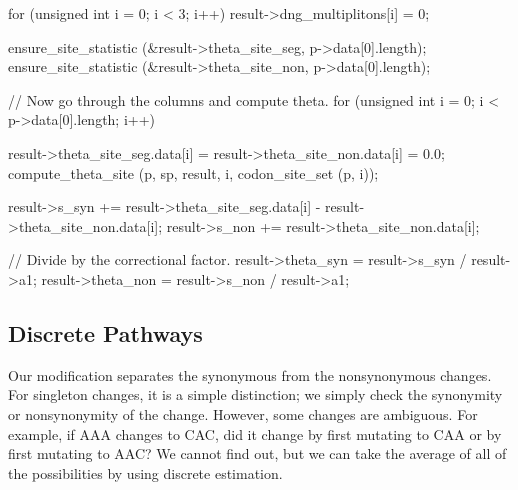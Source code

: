 \documentclass{article}
\begin{document}
\begin{ccode}
{  for (unsigned int i = 0; i < 3; i++)
    result->dng_multiplitons[i] = 0;

  ensure_site_statistic (&result->theta_site_seg, p->data[0].length);
  ensure_site_statistic (&result->theta_site_non, p->data[0].length);

  // Now go through the columns and compute theta.
  for (unsigned int i = 0; i < p->data[0].length; i++) {
    result->theta_site_seg.data[i] = result->theta_site_non.data[i] = 0.0;
    compute_theta_site (p, sp, result, i, codon_site_set (p, i));
    
    result->s_syn += result->theta_site_seg.data[i] - result->theta_site_non.data[i];
    result->s_non += result->theta_site_non.data[i];
  }

  // Divide by the correctional factor.
  result->theta_syn = result->s_syn / result->a1;
  result->theta_non = result->s_non / result->a1;
}
\end{ccode}

    \subsection{Discrete Pathways}
      \label{sec:pathways}

      Our modification separates the synonymous from the nonsynonymous changes.
      For singleton changes, it is a simple distinction; we simply check the
      synonymity or nonsynonymity of the change. However, some changes are
      ambiguous. For example, if AAA changes to CAC, did it change by first
      mutating to CAA or by first mutating to AAC? We cannot find out, but we
      can take the average of all of the possibilities by using discrete
      estimation.
\end{document}
